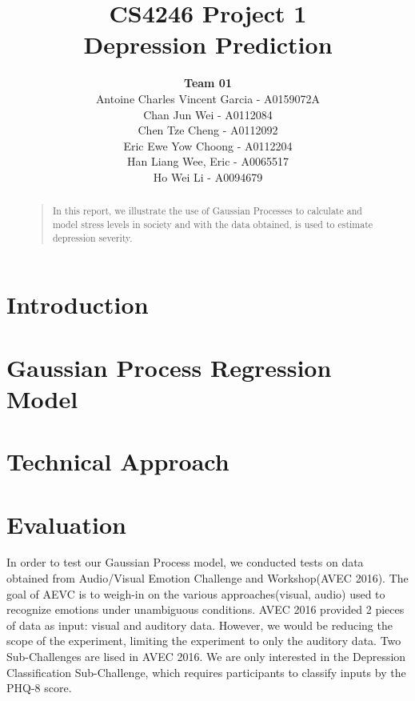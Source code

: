 \documentclass{article}
\title{
	CS4246 Project 1\\ Depression Prediction
}
\author{
	{\bf Team 01} \\
	Antoine Charles Vincent Garcia - A0159072A\\
	Chan Jun Wei - A0112084\\
	Chen Tze Cheng - A0112092\\
	Eric Ewe Yow Choong - A0112204\\
	Han Liang Wee, Eric - A0065517\\
	Ho Wei Li - A0094679\\
}
\begin{document}
 	\maketitle

	\begin{abstract}
	\begin{quote}
	In this report, we illustrate the use of Gaussian Processes to calculate and model stress levels in society and with the data obtained, is used to estimate depression severity.
	\end{quote}
	\end{abstract}
	
	\section{Introduction}

	\section{Gaussian Process Regression Model}

	\section{Technical Approach}

	\section{Evaluation}
	In order to test our Gaussian Process model, we conducted tests on data obtained from Audio/Visual Emotion Challenge and Workshop(AVEC 2016). The goal of AEVC is to weigh-in on the various approaches(visual, audio) used to recognize emotions under unambiguous conditions. AVEC 2016 provided 2 pieces of data as input: visual and auditory data. However, we would be reducing the scope of the experiment, limiting the experiment to only the auditory data. Two Sub-Challenges are lised in AVEC 2016. We are only interested in the Depression Classification Sub-Challenge, which requires participants to classify inputs by the PHQ-8 score.
\end{document}
